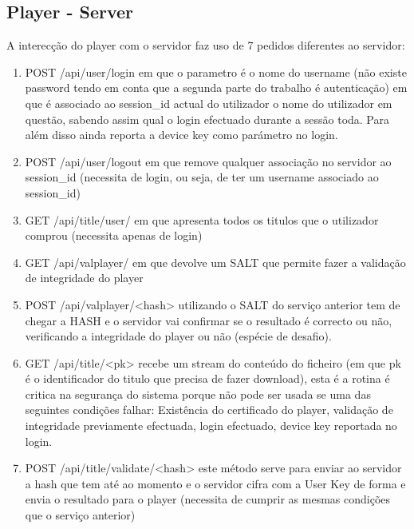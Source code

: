 \documentclass[11pt,a4paper]{report}
\begin{document}
\subsection{Player - Server}
A interecção do player com o servidor faz uso de 7 pedidos diferentes ao servidor:
\begin{enumerate}
\item POST  /api/user/login em que o parametro é o nome do username (não existe password tendo em conta que a segunda parte do trabalho é autenticação) em que é associado ao session\_id actual do utilizador o nome do utilizador em questão, sabendo assim qual o login efectuado durante a sessão toda. Para além disso ainda reporta a device key como parámetro no login.
\item POST  /api/user/logout em que remove qualquer associação no servidor ao session\_id (necessita de login, ou seja, de ter um username associado ao session\_id)
\item GET   /api/title/user/ em que apresenta todos os titulos que o utilizador comprou (necessita apenas de login)
\item GET   /api/valplayer/ em que devolve um SALT que permite fazer a validação de integridade do player
\item POST  /api/valplayer/<hash> utilizando o SALT do serviço anterior tem de chegar a HASH e o servidor vai confirmar se o resultado é correcto ou não, verificando a integridade do player ou não (espécie de desafio).
\item GET   /api/title/<pk> recebe um stream do conteúdo do ficheiro (em que pk é o identificador do titulo que precisa de fazer download), esta é a rotina é critica na segurança do sistema porque não pode ser usada se uma das seguintes condições falhar: Existência do certificado do player, validação de integridade previamente efectuada, login efectuado, device key reportada no login.
\item POST  /api/title/validate/<hash> este método serve para enviar ao servidor a hash que tem até ao momento e o servidor cifra com a User Key de forma e envia o resultado para o player (necessita de cumprir as mesmas condições que o serviço anterior)
\end{enumerate}
\end{document}
